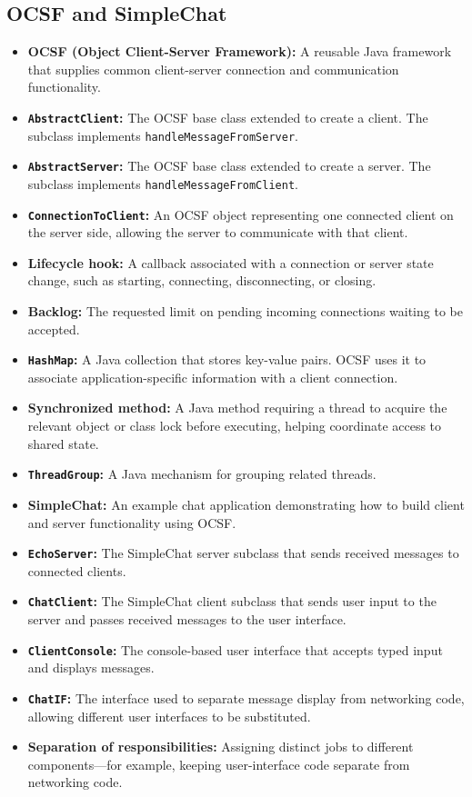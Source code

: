 \documentclass[11pt]{article}
\newenvironment{DottedList}{%
  \begin{itemize}[leftmargin=2em, itemsep=0.35em, topsep=0.35em, label=\textbullet]
}{%
  \end{itemize}
}
\begin{document}
\subsection*{OCSF and SimpleChat}
\begin{DottedList}
  \item \textbf{OCSF (Object Client-Server Framework):} A reusable Java framework that supplies common client-server connection and communication functionality.
  \item \textbf{\texttt{AbstractClient}:} The OCSF base class extended to create a client. The subclass implements \texttt{handleMessageFromServer}.
  \item \textbf{\texttt{AbstractServer}:} The OCSF base class extended to create a server. The subclass implements \texttt{handleMessageFromClient}.
  \item \textbf{\texttt{ConnectionToClient}:} An OCSF object representing one connected client on the server side, allowing the server to communicate with that client.
  \item \textbf{Lifecycle hook:} A callback associated with a connection or server state change, such as starting, connecting, disconnecting, or closing.
  \item \textbf{Backlog:} The requested limit on pending incoming connections waiting to be accepted.
  \item \textbf{\texttt{HashMap}:} A Java collection that stores key-value pairs. OCSF uses it to associate application-specific information with a client connection.
  \item \textbf{Synchronized method:} A Java method requiring a thread to acquire the relevant object or class lock before executing, helping coordinate access to shared state.
  \item \textbf{\texttt{ThreadGroup}:} A Java mechanism for grouping related threads.
  \item \textbf{SimpleChat:} An example chat application demonstrating how to build client and server functionality using OCSF.
  \item \textbf{\texttt{EchoServer}:} The SimpleChat server subclass that sends received messages to connected clients.
  \item \textbf{\texttt{ChatClient}:} The SimpleChat client subclass that sends user input to the server and passes received messages to the user interface.
  \item \textbf{\texttt{ClientConsole}:} The console-based user interface that accepts typed input and displays messages.
  \item \textbf{\texttt{ChatIF}:} The interface used to separate message display from networking code, allowing different user interfaces to be substituted.
  \item \textbf{Separation of responsibilities:} Assigning distinct jobs to different components---for example, keeping user-interface code separate from networking code.
\end{DottedList}
\end{document}
